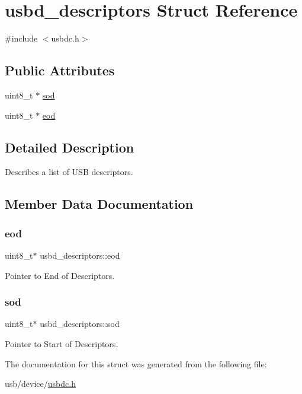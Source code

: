 \hypertarget{structusbd__descriptors}{}\section{usbd\+\_\+descriptors Struct Reference}
\label{structusbd__descriptors}


{\ttfamily \#include $<$usbdc.\+h$>$}

\subsection*{Public Attributes}
\begin{DoxyCompactItemize}
\item 
uint8\+\_\+t $\ast$ \hyperlink{structusbd__descriptors_a21ef20b203a8e5364a15299ac22a16f5}{sod}
\item 
uint8\+\_\+t $\ast$ \hyperlink{structusbd__descriptors_aaa2c8e621f8311a9891bd3444db9b551}{eod}
\end{DoxyCompactItemize}


\subsection{Detailed Description}
Describes a list of U\+SB descriptors. 

\subsection{Member Data Documentation}
\mbox{\label{structusbd__descriptors_aaa2c8e621f8311a9891bd3444db9b551}} 
\subsubsection{\texorpdfstring{eod}{eod}}
{\footnotesize\ttfamily uint8\+\_\+t$\ast$ usbd\+\_\+descriptors\+::eod}

Pointer to End of Descriptors. \mbox{\label{structusbd__descriptors_a21ef20b203a8e5364a15299ac22a16f5}} 
\subsubsection{\texorpdfstring{sod}{sod}}
{\footnotesize\ttfamily uint8\+\_\+t$\ast$ usbd\+\_\+descriptors\+::sod}

Pointer to Start of Descriptors. 

The documentation for this struct was generated from the following file\+:\begin{DoxyCompactItemize}
\item 
usb/device/\hyperlink{usbdc_8h}{usbdc.\+h}\end{DoxyCompactItemize}
